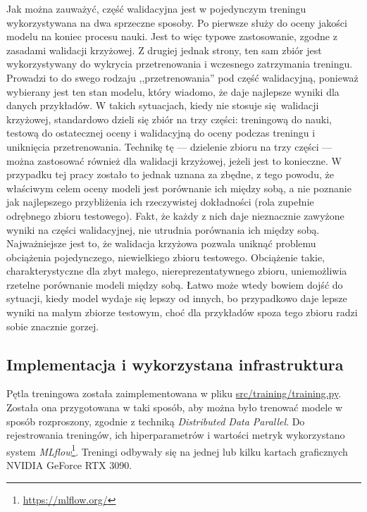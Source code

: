 Jak można zauważyć, część walidacyjna jest w pojedynczym treningu wykorzystywana na dwa sprzeczne
sposoby. Po pierwsze służy do oceny jakości modelu na koniec procesu nauki. Jest to więc typowe
zastosowanie, zgodne z zasadami walidacji krzyżowej. Z drugiej jednak strony, ten sam zbiór jest
wykorzystywany do wykrycia przetrenowania i wczesnego zatrzymania treningu. Prowadzi to do swego
rodzaju ,,przetrenowania'' pod część walidacyjną, ponieważ wybierany jest ten stan modelu, który
wiadomo, że daje najlepsze wyniki dla danych przykładów. W takich sytuacjach, kiedy nie stosuje
się walidacji krzyżowej, standardowo dzieli się zbiór na trzy części: treningową do nauki, testową
do ostatecznej oceny i walidacyjną do oceny podczas treningu i uniknięcia przetrenowania. Technikę
tę --- dzielenie zbioru na trzy części --- można zastosować również dla walidacji krzyżowej, jeżeli
jest to konieczne. W przypadku tej pracy zostało to jednak uznana za zbędne, z tego powodu, że
właściwym celem oceny modeli jest porównanie ich między sobą, a nie poznanie jak najlepszego
przybliżenia ich rzeczywistej dokładności (rola zupełnie odrębnego zbioru testowego). Fakt, że każdy
z nich daje nieznacznie zawyżone wyniki na części walidacyjnej, nie utrudnia porównania ich między
sobą. Najważniejsze jest to, że walidacja krzyżowa pozwala uniknąć problemu obciążenia pojedynczego,
niewielkiego zbioru testowego. Obciążenie takie, charakterystyczne dla zbyt małego,
niereprezentatywnego zbioru, uniemożliwia rzetelne porównanie modeli między sobą. Łatwo może wtedy
bowiem dojść do sytuacji, kiedy model wydaje się lepszy od innych, bo przypadkowo daje lepsze
wyniki na małym zbiorze testowym, choć dla przykładów spoza tego zbioru radzi sobie znacznie
gorzej.

\subsection{Implementacja i wykorzystana infrastruktura}

Pętla treningowa została zaimplementowana w pliku \url{src/training/training.py}. Została ona
przygotowana w taki sposób, aby można było trenować modele w sposób rozproszony, zgodnie z techniką
\emph{Distributed Data Parallel}. Do rejestrowania treningów, ich hiperparametrów i wartości metryk
wykorzystano system \emph{MLflow}\footnote{\url{https://mlflow.org/}}. Treningi odbywały się na
jednej lub kilku kartach graficznych NVIDIA GeForce RTX 3090.

